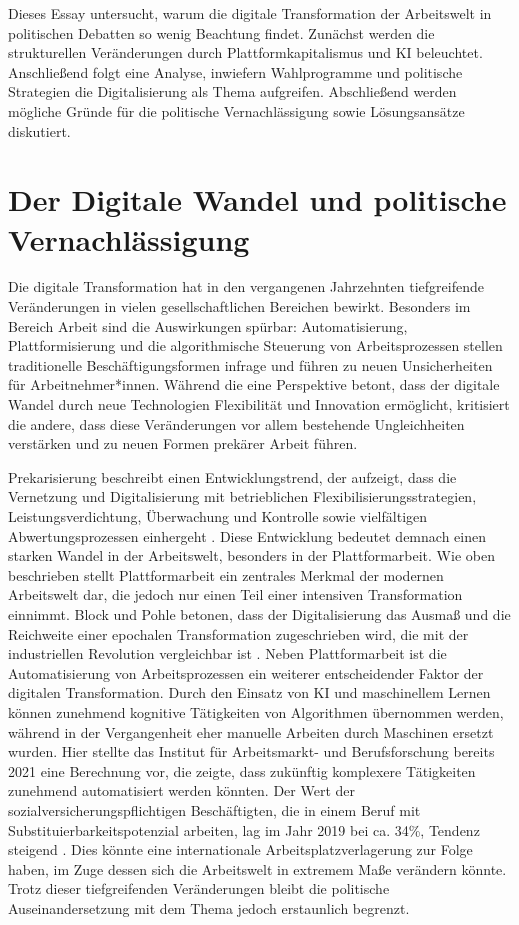 \documentclass[12pt]{article}
\begin{document}
Dieses Essay untersucht, warum die digitale Transformation der Arbeitswelt in politischen Debatten so wenig Beachtung findet. Zunächst werden die strukturellen Veränderungen durch Plattformkapitalismus und KI beleuchtet. Anschließend folgt eine Analyse, inwiefern Wahlprogramme und politische Strategien die Digitalisierung als Thema aufgreifen. Abschließend werden mögliche Gründe für die politische Vernachlässigung sowie Lösungsansätze diskutiert.

\section{Der Digitale Wandel und politische Vernachlässigung}
Die digitale Transformation hat in den vergangenen Jahrzehnten tiefgreifende Veränderungen in vielen gesellschaftlichen Bereichen bewirkt. Besonders im Bereich Arbeit sind die Auswirkungen spürbar: Automatisierung, Plattformisierung und die algorithmische Steuerung von Arbeitsprozessen stellen traditionelle Beschäftigungsformen infrage und führen zu neuen Unsicherheiten für Arbeitnehmer*innen. Während die eine Perspektive betont, dass der digitale Wandel durch neue Technologien Flexibilität und Innovation ermöglicht, kritisiert die andere, dass diese Veränderungen vor allem bestehende Ungleichheiten verstärken und zu neuen Formen prekärer Arbeit führen. 

Prekarisierung beschreibt einen Entwicklungstrend, der aufzeigt, dass die Vernetzung und Digitalisierung mit betrieblichen Flexibilisierungsstrategien, Leistungsverdichtung, Überwachung und Kontrolle sowie vielfältigen Abwertungsprozessen einhergeht \autocite[vgl.][193f.]{martin_digitale_2017}. Diese Entwicklung bedeutet demnach einen starken Wandel in der Arbeitswelt, besonders in der Plattformarbeit. Wie oben beschrieben stellt Plattformarbeit ein zentrales Merkmal der modernen Arbeitswelt dar, die jedoch nur einen Teil einer intensiven Transformation einnimmt. Block und Pohle betonen, dass der Digitalisierung das Ausmaß und die Reichweite einer epochalen Transformation zugeschrieben wird, die mit der industriellen Revolution vergleichbar ist \autocite[vgl.][190]{block_digitalisierung_2023}. Neben Plattformarbeit ist die Automatisierung von Arbeitsprozessen ein weiterer entscheidender Faktor der digitalen Transformation. Durch den Einsatz von KI und maschinellem Lernen können zunehmend kognitive Tätigkeiten von Algorithmen übernommen werden, während in der Vergangenheit eher manuelle Arbeiten durch Maschinen ersetzt wurden. Hier stellte das Institut für Arbeitsmarkt- und Berufsforschung bereits 2021 eine Berechnung vor, die zeigte, dass zukünftig komplexere Tätigkeiten zunehmend automatisiert werden könnten. Der Wert der sozialversicherungspflichtigen Beschäftigten, die in einem Beruf mit Substituierbarkeitspotenzial arbeiten, lag im Jahr 2019 bei ca. 34\%, Tendenz steigend \autocite[vgl.][1]{iab_iab_2021}. Dies könnte eine internationale Arbeitsplatzverlagerung zur Folge haben, im Zuge dessen sich die Arbeitswelt in extremem Maße verändern könnte. Trotz dieser tiefgreifenden Veränderungen bleibt die politische Auseinandersetzung mit dem Thema jedoch erstaunlich begrenzt. 
\end{document}

